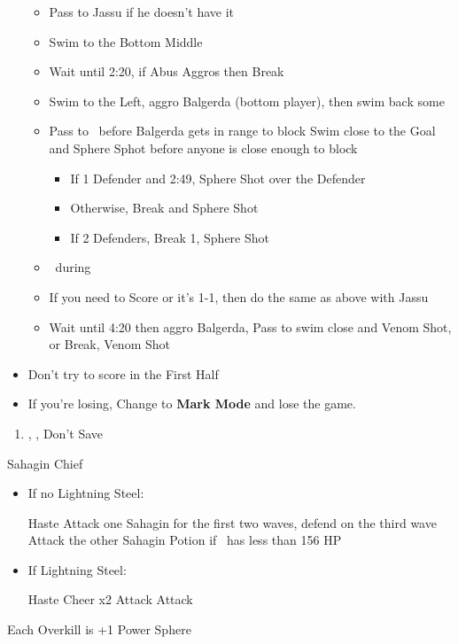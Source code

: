 \begin{blitzball}
\begin{itemize}
\begin{itemize}
    	\item Pass to Jassu if he doesn't have it
    	\item Swim to the Bottom Middle
    	\item Wait until 2:20, if Abus Aggros then Break
    	\item Swim to the Left, aggro Balgerda (bottom player), then swim back some
    	\item Pass to \tidus\ before Balgerda gets in range to block
    	\tidusf Swim close to the Goal and Sphere Sphot before anyone is close enough to block
    	\begin{itemize}
    		\item If 1 Defender and 2:49, Sphere Shot over the Defender
    		\item Otherwise, Break and Sphere Shot
    		\item If 2 Defenders, Break 1, Sphere Shot
	\end{itemize}
	\item \sd\ during \wakka\ \cs
	\item If you need to Score or it's 1-1, then do the same as above with Jassu
	\item Wait until 4:20 then aggro Balgerda, Pass to \wakka
	\wakkaf swim close and Venom Shot, or Break, Venom Shot
	\end{itemize}
  \item Don't try to score in the First Half
  \item If you're losing, Change to \textbf{Mark Mode} and lose the game.
  \end{itemize}
\end{blitzball}
\begin{enumerate}[resume]
  \item \sd, \cs[1:00], Don't Save
\end{enumerate}
\begin{battle}{Sahagin Chief}
  \begin{itemize}
    \item{If no Lightning Steel:}
          \begin{itemize}
            \tidusf Haste \tidus
            \wakkaf Attack one Sahagin for the first two waves, defend on the third wave
            \tidusf Attack the other Sahagin
            \wakkaf Potion if \tidus\ has less than 156 HP
          \end{itemize}
    \item{If Lightning Steel:}
          \begin{itemize}
            \tidusf Haste \tidus
            \tidusf Cheer x2
            \wakkaf Attack
            \tidusf Attack
          \end{itemize}
  \end{itemize}
Each Overkill is +1 Power Sphere
\end{battle}
